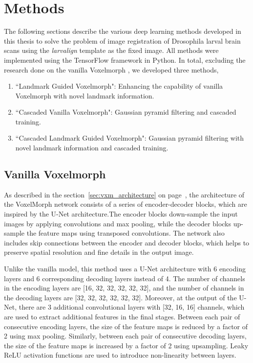 \documentclass{book}
\begin{document}
	\chapter{Methods}\label{chap:methods}
	
	The following sections describe the various deep learning methods developed in this thesis to solve the problem of image registration of Drosophila larval brain scans using the \textit{larvalign} template \cite{larvalign} as the fixed image. All methods were implemented using the TensorFlow framework in Python. In total, excluding the research done on the vanilla Voxelmorph \cite{Balakrishnan_2019}, we developed three methods,
	\begin{enumerate}
		\item ``Landmark Guided Voxelmorph": Enhancing the capability of vanilla Voxelmorph with novel landmark information.
		\item ``Cascaded Vanilla Voxelmorph": Gaussian pyramid filtering and cascaded training.
		\item ``Cascaded Landmark Guided Voxelmorph": Gaussian pyramid filtering with novel landmark information and cascaded training.
	\end{enumerate}

	\section{Vanilla Voxelmorph}\label{sec:method1}
	
	As described in the section~\ref{sec:vxm_architecture} on page~\pageref{sec:vxm_architecture}, the architecture of the VoxelMorph network consists of a series of encoder-decoder blocks, which are inspired by the U-Net architecture.The encoder blocks down-sample the input images by applying convolutions and max pooling, while the decoder blocks up-sample the feature maps using transposed convolutions. The network also includes skip connections between the encoder and decoder blocks, which helps to preserve spatial resolution and fine details in the output image.
	
	Unlike the vanilla model, this method uses a U-Net architecture with 6 encoding layers and 6 corresponding decoding layers instead of 4. The number of channels in the encoding layers are [16, 32, 32, 32, 32, 32], and the number of channels in the decoding layers are [32, 32, 32, 32, 32, 32]. Moreover, at the output of the U-Net, there are 3 additional convolutional layers with [32, 16, 16] channels, which are used to extract additional features in the final stages. Between each pair of consecutive encoding layers, the size of the feature maps is reduced by a factor of 2 using max pooling. Similarly, between each pair of consecutive decoding layers, the size of the feature maps is increased by a factor of 2 using upsampling. Leaky ReLU activation functions are used to introduce non-linearity between layers.
	
\end{document}
